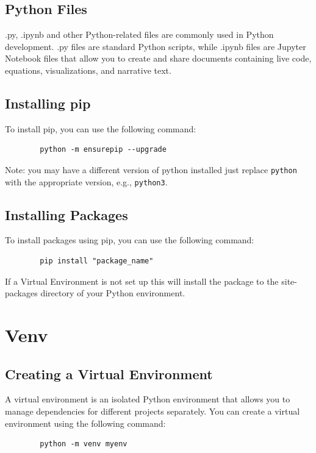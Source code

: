 \documentclass[a4paper,11pt]{article}
\begin{document}
        \subsection{Python Files}
        .py, .ipynb and other Python-related files are commonly used in Python development. .py files are standard Python scripts, while .ipynb files are Jupyter Notebook files 
        that allow you to create and share documents containing live code, equations, visualizations, and narrative text.


        \subsection{Installing pip}
        To install pip, you can use the following command:
        \begin{verbatim}
        python -m ensurepip --upgrade
        \end{verbatim}
        Note: you may have a different version of python installed just replace \texttt{python} with the appropriate version, e.g., \texttt{python3}.

        \subsection{Installing Packages}
        To install packages using pip, you can use the following command:
        \begin{verbatim}
        pip install "package_name"
        \end{verbatim}
        If a Virtual Environment is not set up this will install the package to the site-packages directory of your Python environment. 



    \section{Venv}

        \subsection{Creating a Virtual Environment}
        A virtual environment is an isolated Python environment that allows you to manage dependencies for different projects separately. You can create a virtual environment 
        using the following command:
        \begin{verbatim}
        python -m venv myenv
        \end{verbatim}
\end{document}
